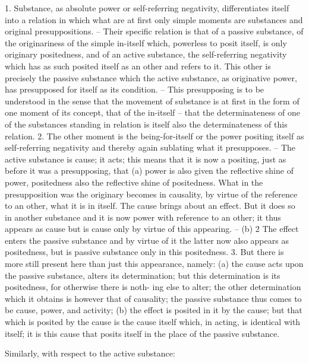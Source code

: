 1. Substance, as absolute power or self-referring negativity, differentiates
itself into a relation in which what are at first only simple moments are
substances and original presuppositions. – Their specific relation is that
of a passive substance, of the originariness of the simple in-itself which,
powerless to posit itself, is only originary positedness, and of an active
substance, the self-referring negativity which has as such posited itself as
an other and refers to it. This other is precisely the passive substance
which the active substance, as originative power, has presupposed for itself
as its condition. – This presupposing is to be understood in the sense
that the movement of substance is at first in the form of one moment of
its concept, that of the in-itself – that the determinateness of one of the
substances standing in relation is itself also the determinateness of this
relation.
2. The other moment is the being-for-itself or the power positing itself as
self-referring negativity and thereby again sublating what it presupposes. –
The active substance is cause; it acts; this means that it is now a positing,
just as before it was a presupposing, that (a) power is also given the reflective
shine of power, positedness also the reflective shine of positedness. What
in the presupposition was the originary becomes in causality, by virtue
of the reference to an other, what it is in itself. The cause brings about
an effect. But it does so in another substance and it is now power with
reference to an other; it thus appears as cause but is cause only by virtue
of this appearing. – (b) 2 The effect enters the passive substance and
by virtue of it the latter now also appears as positedness, but is passive
substance only in this positedness.
3. But there is more still present here than just this appearance, namely:
(a) the cause acts upon the passive substance, alters its determination;
but this determination is its positedness, for otherwise there is noth-
ing else to alter; the other determination which it obtains is however
that of causality; the passive substance thus comes to be cause, power,
and activity;
(b) the effect is posited in it by the cause; but that which is posited by
the cause is the cause itself which, in acting, is identical with itself;
it is this cause that posits itself in the place of the passive substance.

Similarly, with respect to the active substance:

